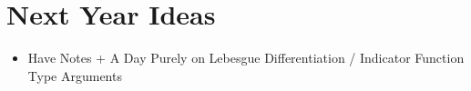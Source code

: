 \documentclass[answers]{exam}
\theoremstyle{problemstyle}
\newcommand{\1}[1]{\textbf{1}_{\left[#1\right]}} %
\begin{document}
\begin{questions}
\begin{parts}
\begin{solution}
\begin{comment}
    	\[ \widehat{T_\alpha f}(n) = \int_0^1 \int_0^1 \sin(x + y) | x - y |^{-\alpha} f(y) e^{-2 \pi i n x}\; dx\; dy. \]




    	My intuition to construct an example here is to consider a function which is widely 

    	Assume $\alpha \geq 1/2$, and write $f_N = \log(N)^{1/2} (\chi_1 + \dots + \chi_M)$, where
    	\begin{itemize}
				\item $(1/C)N \leq M \leq C N$ for some universal constant $C > 0$.
				\item $\chi_j = \chi_{I_j}$ for some interval $I_j$ of length $1/ N \log N$.
				\item If $x,y \in 10 I_j$, $\sin(x + y) \geq 1/2$.
				\item The set of intervals $\{ 10 I_j \}$ are disjoint from one another, where $10 I_j$ denotes the interval with the same center as $I_j$, but ten times the radius.
			\end{itemize}
			Now $T_\alpha \chi_j \geq 0$ for all $j$. And for $x \in 10I_j - 2I_j$,
			\[ T_\alpha \chi_j(x) \geq (1/2) \int_{I_j} |x - y|^{-\alpha} \; dy \gtrsim N^{\alpha - 1}. \]
			and for $k \neq j$,
			\[ T_\alpha \chi_k(x) \gtrsim N^{-1} \]
			Thus $|T_\alpha f| \gtrsim \log(N)^{1/2} (  1 + N^{\alpha - 1} )$

			and so
			\[ |T_\alpha f(x)| \gtrsim \log(N)^{1/2} |T_\alpha \chi_j(x)| \gtrsim \log(N)^{1/2} N^{\alpha - 1/2}. \]
			Thus
			\[ \| T_\alpha f \|_{L^2[0,1]} = \left( \sum_j \| T_\alpha f \|_{L^2(10 I_j - 2 I_j)}^2 \right)^{1/2} \gtrsim \left( \sum_j (N \log N)^{-1} (\log(N) N^{2\alpha - 1}) \right)^{1/2} \gtrsim N^{\alpha - 1/2}. \]
		\end{comment}
    \end{solution}
\end{parts}


\newpage
\section{Next Year Ideas}

\begin{itemize}
	\item Have Notes + A Day Purely on Lebesgue Differentiation / Indicator Function Type Arguments
\end{itemize}


\end{questions}
\end{document}
